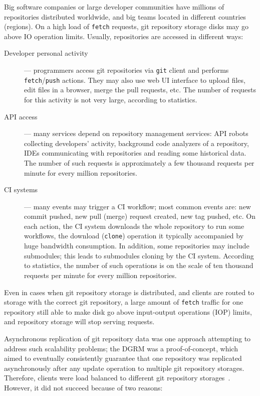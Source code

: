 \documentclass[acmlarge, screen, nonacm, 11pt]{acmart}
\newcommand{\code}[1]{\texttt{#1}}
\begin{document}
Big software companies or large developer communities have
millions of repositories distributed worldwide, and big teams located in different countries
(regions). On a high load of \code{fetch} requests, git repository storage disks may go above IO operation limits.
Usually, repositories are accessed in different ways:
\begin{description}
  \item[Developer personal activity] --- programmers access git repositories via
    \code{git} client and performs \code{fetch}/\code{push} actions. They may also use web UI interface to upload files,
    edit files in a browser, merge the pull requests, etc.
    The number of requests for this activity is not very large, according to statistics.
  \item[API access] --- many services depend on repository management services: API robots
    collecting developers' activity, background code analyzers of a repository, IDEs communicating
    with repositories and reading some historical data. The number of such requests is approximately
    a few thousand requests per minute for every million repositories.
  \item[CI systems] --- many events may trigger a CI workflow; most common events are:
    new commit pushed, new pull (merge) request created, new tag pushed, etc.
    On each action, the CI system downloads the whole repository to run some workflows,
    the download (\code{clone}) operation it typically accompanied by huge bandwidth consumption.
    In addition, some repositories may include submodules; this leads to submodules cloning by the CI
    system. According to statistics, the number of such operations is on the scale of ten thousand requests per minute
    for every million repositories.
\end{description}

Even in cases when git repository storage is distributed, and clients are routed to storage with the correct git repository,
a large amount of \code{fetch} traffic for one repository still able to
make disk go above input-output operations (IOP) limits, and repository storage will stop
serving requests.

Asynchronous replication of git repository data was one approach attempting to address such scalability problems;
the DGRM was a proof-of-concept, which aimed to eventually consistently guarantee that one repository was replicated 
asynchronously after any update operation to multiple git repository storages. Therefore,
clients were load balanced to different git repository storages~\cite{Eventual_Consistency}.
However, it did not succeed because of two reasons:
\end{document}
